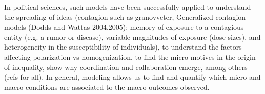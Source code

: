 In political sciences, such models have been successfully applied to understand the spreading of ideas (contagion such as granovveter, Generalized contagion models (Dodds and Wattas 2004,2005): memory of exposure to a contagious entity (e.g. a rumor or disease), variable magnitudes of exposure (dose sizes), and heterogeneity in the susceptibility of individuals), 
to understand the factors affecting polarization vs homogenization. 
to find the micro-motives in the origin of inequality, 
show why coordination and collaboration emerge,
among others (refs for all). 
In general, modeling allows us to find and quantify which micro and macro-conditions are associated to the macro-outcomes observed.






%


